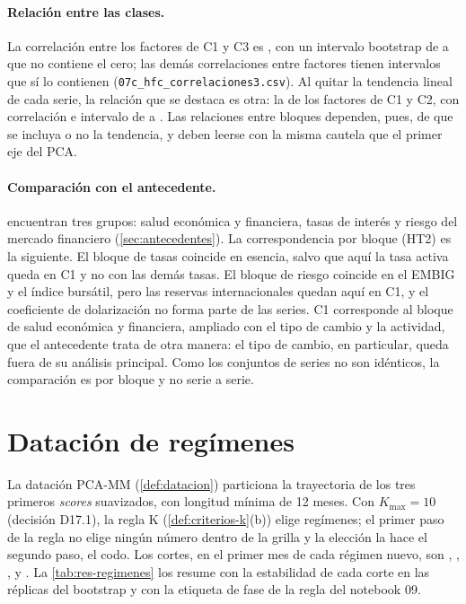 \paragraph{Relación entre las clases.} La correlación entre los factores de C1 y C3 es
\rFactoresUnoTres{}, con un intervalo bootstrap de \rFactoresUnoTresPcinco{} a
\rFactoresUnoTresPnoventaycinco{} que no contiene el cero; las demás correlaciones entre factores
tienen intervalos que sí lo contienen (\texttt{07c\_hfc\_correlaciones3.csv}). Al quitar la
tendencia lineal de cada serie, la relación que se destaca es otra: la de los factores de C1 y C2,
con correlación \rFactoresUnoDosSinTendencia{} e intervalo de
\rFactoresUnoDosSinTendenciaPcinco{} a \rFactoresUnoDosSinTendenciaPnoventaycinco{}. Las relaciones
entre bloques dependen, pues, de que se incluya o no la tendencia, y deben leerse con la misma
cautela que el primer eje del PCA.

\paragraph{Comparación con el antecedente.} \textcite{camiz_cerda_atoche_2026} encuentran tres
grupos: salud económica y financiera, tasas de interés y riesgo del mercado financiero
(\cref{sec:antecedentes}). La correspondencia por bloque (HT2) es la siguiente. El bloque de tasas
coincide en esencia, salvo que aquí la tasa activa queda en C1 y no con las demás tasas. El bloque
de riesgo coincide en el EMBIG y el índice bursátil, pero las reservas internacionales quedan aquí
en C1, y el coeficiente de dolarización no forma parte de las \nSeries{} series. C1 corresponde al
bloque de salud económica y financiera, ampliado con el tipo de cambio y la actividad, que el
antecedente trata de otra manera: el tipo de cambio, en particular, queda fuera de su análisis
principal. Como los conjuntos de series no son idénticos, la comparación es por bloque y no serie a
serie.


\section{Datación de regímenes}
\label{sec:res-datacion}

La datación PCA-MM\ventanaMediaMovil{} (\cref{def:datacion}) particiona la trayectoria de los tres
primeros \emph{scores} suavizados, con longitud mínima de 12 meses. Con $K_{\max}=10$ (decisión
D17.1), la regla K (\cref{def:criterios-k}(b)) elige \nRegimenesPrincipal{} regímenes; el primer
paso de la regla no elige ningún número dentro de la grilla y la elección la hace el segundo paso,
el codo. Los cortes, en el primer mes de cada régimen nuevo, son \corteDatacionUno{},
\corteDatacionDos{}, \corteDatacionTres{}, \corteDatacionCuatro{} y \corteDatacionCinco{}. La
\cref{tab:res-regimenes} los resume con la estabilidad de cada corte en las réplicas del bootstrap
y con la etiqueta de fase de la regla del notebook 09.

